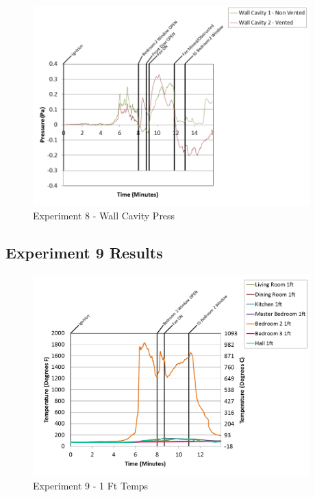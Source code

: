 \documentclass{article}
\begin{document}
\begin{appendices}
\clearpage

\begin{figure}[h!]
	\centering
	\includegraphics[height=3.05in]{0_Images/Results_Charts/Exp_8_Charts/WallCavityPress.png}
	\caption{Experiment 8 - Wall Cavity Press}
\end{figure}


\clearpage
\clearpage		\large
\subsection{Experiment 9 Results} \label{App:Exp9Results} 

\begin{figure}[h!]
	\centering
	\includegraphics[height=3.05in]{0_Images/Results_Charts/Exp_9_Charts/1FtTemps.png}
	\caption{Experiment 9 - 1 Ft Temps}
\end{figure}



\end{appendices}
\end{document}
